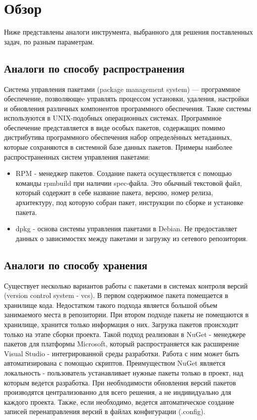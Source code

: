 \documentclass{matmex-diploma-custom}
\begin{document}
\section{Обзор}
Ниже представлены аналоги инструмента, выбранного для решения поставленных задач, по разным параметрам.
\subsection{Аналоги по способу распространения}  
Система управления пакетами (package management system) \cite{wiki:pac} — программное обеспечение, позволяющеe управлять процессом установки, удаления, настройки и обновления различных компонентов программного обеспечения. Такие системы используются в UNIX-подобных операционных системах. Программное обеспечение представляется в виде особых пакетов, содержащих помимо дистрибутива программного обеспечения набор определённых метаданных, которые сохраняются в системной базе данных пакетов.
Примеры наиболее распространенных систем управления пакетами:
\begin{itemize}
\item RPM - менеджер пакетов. Создание пакета осуществляется с помощью команды rpmbuild при наличии spec-файла. Это обычный текстовой файл, который содержит в себе название пакета, версию, номер релиза, архитектуру, под которую собран пакет, инструкции по сборке и установке пакета.
\item dpkg -  основа системы управления пакетами в Debian. Не предоставляет данных о зависимостях между пакетами и загрузку из сетевого репозитория.
\end{itemize}
\subsection{Аналоги по способу хранения} 
Существует несколько вариантов работы с пакетами в системах контроля версий (version control system - vcs). В первом содержимое пакета помещается в хранилище кода. Недостатком такого подхода является большой объем занимаемого места в репозитории. 
При втором подходе пакеты не помещаются в хранилище, хранится только информация о них. Загрузка пакетов происходит только на этапе сборки проекта. Такой подход реализован в NuGet - менеджере пакетов для платформы Microsoft, который распространяется как расширение Visual Studio - интегрированной среды разработки. Работа с ним может быть автоматизирована с помощью скриптов.
Преимуществом NuGet является локальность - пользователь устанавливает  нужные пакеты только в проект, над которым ведется разработка. При необходимости обновления версий пакетов производятся централизованно для всего решения, а не индивидуально для каждого проекта. Также, если необходимо, ведется автоматическое создание записей перенаправления версий в файлах конфигурации (.config).
\end{document}
